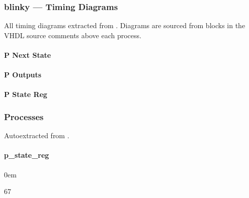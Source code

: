 \documentclass[letterpaper,10pt,english]{sphinxmanual}
\begin{document}
\sphinxstepscope


\subsubsection{blinky — Timing Diagrams}
\label{\detokenize{modules/blinky/timing:blinky-timing-diagrams}}\label{\detokenize{modules/blinky/timing::doc}}
\sphinxAtStartPar
All timing diagrams extracted from .
Diagrams are sourced from  blocks in the VHDL
source comments above each process.


\paragraph{P Next State}
\label{\detokenize{modules/blinky/timing:p-next-state}}
\noindent{}


\paragraph{P Outputs}
\label{\detokenize{modules/blinky/timing:p-outputs}}
\noindent{}


\paragraph{P State Reg}
\label{\detokenize{modules/blinky/timing:p-state-reg}}
\noindent{}

\sphinxstepscope


\subsubsection{Processes}
\label{\detokenize{modules/blinky/processes/index:processes}}\label{\detokenize{modules/blinky/processes/index::doc}}
\sphinxAtStartPar
Auto\sphinxhyphen{}extracted from .

\sphinxstepscope


\paragraph{p\_state\_reg}
\label{\detokenize{modules/blinky/processes/p_state_reg:p-state-reg}}\label{\detokenize{modules/blinky/processes/p_state_reg::doc}}
\begin{DUlineblock}{0em}
\item[]  
\item[]  67
\item[]  
\item[]  
\end{DUlineblock}
\end{document}
